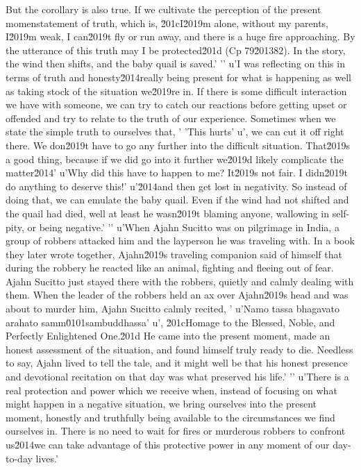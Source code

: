 But the corollary is also true. If we cultivate the perception of the 
present momenstatement of truth, which is, \u201cI\u2019m alone, without my parents, I\u2019m weak, I can\u2019t fly or run away, and there is a huge fire approaching. By the utterance of this truth may I be protected\u201d (Cp 79\u201382). In the story, the wind then shifts, and the baby quail is saved.'
'\n'
u'I was reflecting on this in terms of truth and honesty\u2014really being present for what is happening as well as taking stock of the situation we\u2019re in. If there is some difficult interaction we have with someone, we can try to catch our reactions before getting upset or offended and try to relate to the truth of our experience. Sometimes when we state the simple truth to ourselves that, '
'This hurts'
u', we can cut it off right there. We don\u2019t have to go any further into the difficult situation. That\u2019s a good thing, because if we did go into it further we\u2019d likely complicate the matter\u2014'
u'Why did this have to happen to me? It\u2019s not fair. I didn\u2019t do anything to deserve this!'
u'\u2014and then get lost in negativity. So instead of doing that, we can emulate the baby quail. Even if the wind had not shifted and the quail had died, well at least he wasn\u2019t blaming anyone, wallowing in self-pity, or being negative.'
'\n'
u'When Ajahn Sucitto was on pilgrimage in India, a group of robbers attacked him and the layperson he was traveling with. In a book they later wrote together, Ajahn\u2019s traveling companion said of himself that during the robbery he reacted like an animal, fighting and fleeing out of fear. Ajahn Sucitto just stayed there with the robbers, quietly and calmly dealing with them. When the leader of the robbers held an ax over Ajahn\u2019s head and was about to murder him, Ajahn Sucitto calmly recited, '
u'Namo tassa bhagavato arahato samm\u0101sambuddhassa'
u', \u201cHomage to the Blessed, Noble, and Perfectly Enlightened One.\u201d He came into the present moment, made an honest assessment of the situation, and found himself truly ready to die. Needless to say, Ajahn lived to tell the tale, and it might well be that his honest presence and devotional recitation on that day was what preserved his life.'
'\n'
u'There is a real protection and power which we receive when, instead of focusing on what might happen in a negative situation, we bring ourselves into the present moment, honestly and truthfully being available to the circumstances we find ourselves in. There is no need to wait for fires or murderous robbers to confront us\u2014we can take advantage of this protective power in any moment of our day-to-day lives.'
